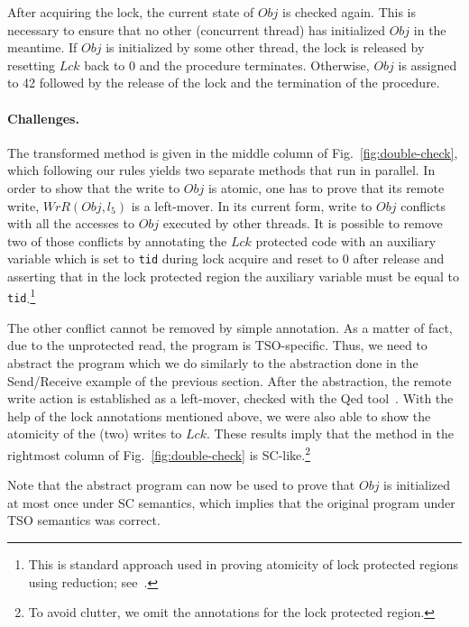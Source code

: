After acquiring the lock, the current state of $Obj$ is checked again.
This is necessary to ensure that no other (concurrent thread) has initialized $Obj$ in the meantime.
If $Obj$ is initialized by some other thread, the lock is released by resetting $Lck$ back to 0 and the procedure terminates.
Otherwise, $Obj$ is assigned to 42 followed by the release of the lock and the termination of the procedure.

\paragraph{Challenges.}
The transformed method is given in the middle column of Fig.~\ref{fig:double-check}, which following our rules yields two separate methods that run in parallel.
In order to show that the write to $Obj$ is atomic, one has to prove that its remote write, $WrR(Obj,l_5)$ is a left-mover.
In its current form, write to $Obj$ conflicts with all the accesses to $Obj$ executed by other threads.
It is possible to remove two of those conflicts by annotating the $Lck$ protected code with an auxiliary variable which is set to {\tt tid} during lock acquire and reset to 0 after release and asserting that in the lock protected region the auxiliary variable must be equal to {\tt tid}.\footnote{This is standard approach used in proving atomicity of lock protected regions using reduction; see~\cite{EQT2009}.} 

The other conflict cannot be removed by simple annotation.
As a matter of fact, due to the unprotected read, the program is TSO-specific.
Thus, we need to abstract the program which we do similarly to the abstraction done in the Send/Receive example of the previous section.
After the abstraction, the remote write action is established as a left-mover, checked with the {\sc Qed} tool~\cite{EQT2009}.
With the help of the lock annotations mentioned above, we were also able to show the atomicity of the (two) writes to $Lck$.
These results imply that the method in the rightmost column of Fig.~\ref{fig:double-check} is SC-like.\footnote{To avoid clutter, we omit the annotations for the lock protected region.}


Note that the abstract program can now be used to prove that $Obj$ is initialized at most once under SC semantics, which implies that the original program under TSO semantics was correct.

